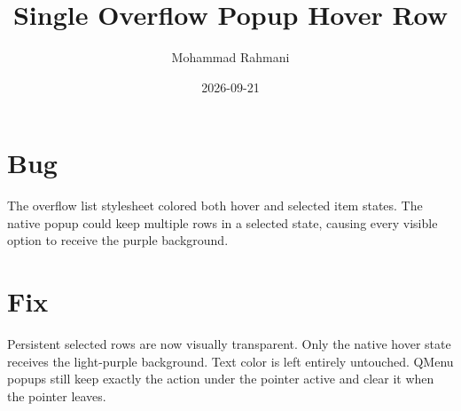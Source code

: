 \documentclass[a4paper]{article}
\title{Single Overflow Popup Hover Row}
\date{2026-09-21}
\author{Mohammad Rahmani}
\begin{document}
   \maketitle

   \begin{preview}
      \section{Bug}
      The overflow list stylesheet colored both hover and selected item states.
      The native popup could keep multiple rows in a selected state, causing
      every visible option to receive the purple background.

      \section{Fix}
      Persistent selected rows are now visually transparent. Only the native
      hover state receives the light-purple background. Text color is left
      entirely untouched. QMenu popups still keep exactly the action under the
      pointer active and clear it when the pointer leaves.
   \end{preview}

   
   
\end{document}
